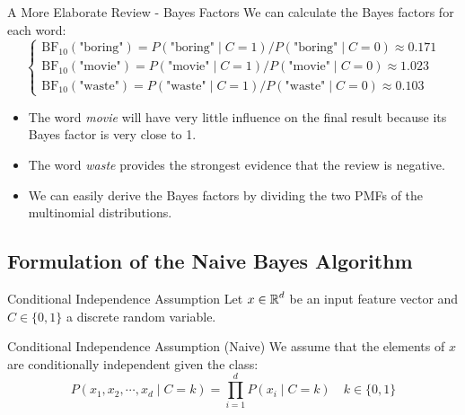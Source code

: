 \begin{frame}{A More Elaborate Review - Bayes Factors}
	We can calculate the Bayes factors for each word:
	\begin{equation}
		\begin{cases}
			\text{BF}_{10}(\text{"boring"}) = P(\text{"boring"} \mid C = 1) / P(\text{"boring"} \mid C = 0) \approx 0.171 \\
			\text{BF}_{10}(\text{"movie"}) = P(\text{"movie"} \mid C = 1) / P(\text{"movie"} \mid C = 0) \approx 1.023 \\
			\text{BF}_{10}(\text{"waste"}) = P(\text{"waste"} \mid C = 1) / P(\text{"waste"} \mid C = 0) \approx 0.103
		\end{cases}
		\nonumber
	\end{equation}
	\pause
	\begin{itemize}
		\item The word \textit{movie} will have very little influence on the final result because its Bayes factor is very close to 1.
		\item The word \textit{waste} provides the strongest evidence that the review is negative.
		\item We can easily derive the Bayes factors by dividing the two PMFs of the multinomial distributions.
	\end{itemize}
\end{frame}

\subsection[Formulation of the Naive Bayes Algorithm]{Formulation of the Naive Bayes Algorithm}

\begin{frame}{Conditional Independence Assumption}
	Let $x \in \operatorname{\mathbb{R}}^d$ be an input feature vector and $C \in \{0, 1\}$ a discrete random variable.
	\vspace{0.3cm}
	\begin{block}{Conditional Independence Assumption (Naive)}
		We assume that the elements of $x$ are conditionally independent given the class:
		\begin{equation}
			P(x_1, x_2, \cdots, x_d \mid C = k) = \prod_{i=1}^{d} P(x_i \mid C = k) \quad k \in \{0, 1\}
			\nonumber
		\end{equation}
	\end{block}
\end{frame}

